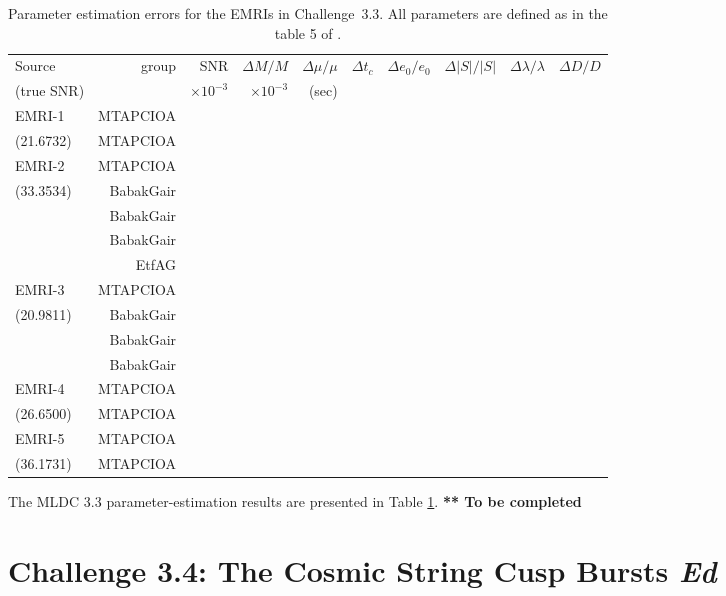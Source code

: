 \documentclass{iopart}
\begin{document}
\begin{table}
\begin{center}
\begin{tabular}{lr|rrrrrrrr}
\hline
Source & group & SNR & $\Delta M/ M  $ & $\Delta \mu/ \mu $ & $ \Delta t_{c} $ &  $ \Delta  e_0 / e_0 $ & $ \Delta |S| / |S| $ & $ \Delta \lambda / \lambda  $ &  $\Delta D / D$ \\
(true SNR) & & $\times 10^{-3}$ & $\times 10^{-3}$ & (sec) &  &  & &    \\

\hline
EMRI-1& MTAPCIOA  & &  & & & & & &  \\
(21.6732) & MTAPCIOA & & & & & & & &     \\
\hline
EMRI-2& MTAPCIOA & & & & & & & &  \\
(33.3534)    & BabakGair & & & & & & & &     \\    
              & BabakGair & & & & & & & &     \\    
              & BabakGair & & & & & & & &     \\       
              & EtfAG & & & & & & & & \\  
\hline
EMRI-3& MTAPCIOA & & & & & & & &  \\
(20.9811)  & BabakGair & & & & & & & &     \\    
             & BabakGair & & & & & & & &     \\    
              & BabakGair & & & & & & & &     \\        
\hline
EMRI-4& MTAPCIOA &  &  & & & & & &  \\
(26.6500)  & MTAPCIOA & & & & & & & &     \\
\hline
EMRI-5& MTAPCIOA  & &  & & & & & &  \\
(36.1731) & MTAPCIOA & & & & & & & &     \\
\hline                                               


\end{tabular}
\end{center}
\caption{Parameter estimation errors for the EMRIs in Challenge~3.3. All parameters are defined as in the table 5 of \cite{mldcgwdaw2}.
\label{tab:EMRI_Err}}
\end{table} 

The MLDC 3.3 parameter-estimation results are presented in Table \ref{tab:EMRI_Err}.
{\bf *** To be completed}

\section{Challenge 3.4: The Cosmic String Cusp Bursts {\it Ed}}
\end{document}
